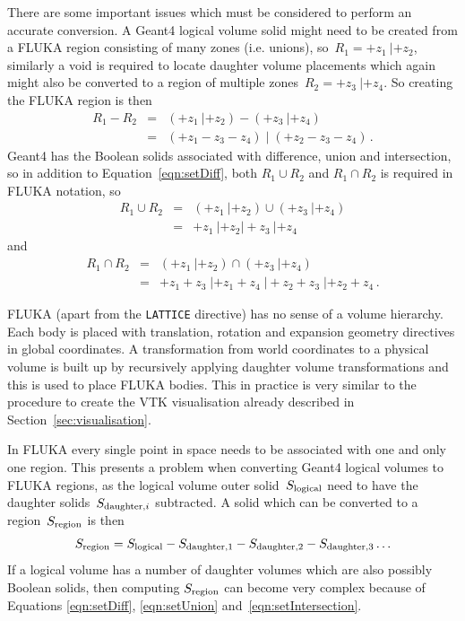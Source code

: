 \documentclass[final,5p,times,twocolumn]{elsarticle}
\newcommand{\fluka}[1]{\texttt{\MakeUppercase{#1}}}
\begin{document}
There are some important issues which must be considered to perform an accurate conversion. 
A Geant4 logical volume solid might need to be created from a FLUKA region consisting of many zones (i.e. unions), 
so~$R_1 = +z_1\: | +z_2$, similarly a void is required to locate daughter volume placements which again 
might also be converted to a region of multiple zones~$R_2= +z_3 \: | +z_4$. So creating the FLUKA region is then 
\begin{eqnarray}
R_1 - R_2 	& = & (+z_1 \: | +z_2) - ( +z_3 \: | +z_4) 			\\
			& = & (+z_1 - z_3 - z_4) \;  | \; (+z_2 - z_3 - z_4)\,.	
\label{eqn:setDiff}
\end{eqnarray}
Geant4 has the Boolean solids associated with difference, union and intersection, so in addition to 
Equation~\ref{eqn:setDiff}, both $R_1 \cup R_2$ and $R_1 \cap R_2$ is required in FLUKA notation, so 
\begin{eqnarray}
R_1 \cup R_2 	& = & (+z_1 \: | +z_2)  \cup ( +z_3 \: | +z_4) \\
			& = & +z_1 \: | +z_2 |  +z_3 \: | +z_4
\label{eqn:setUnion}
\end{eqnarray}
and 
\begin{eqnarray}
R_1 \cap R_2 	& = & (+z_1 \: | +z_2) \cap ( +z_3 \: | +z_4) \\
			& = & +z_1 +z_3  \; | +z_1 +z_4 \; | +z_2 +z_3 \; | +z_2 +z_4\,.
\label{eqn:setIntersection}
\end{eqnarray}

FLUKA (apart from the \fluka{lattice} directive) has no sense of a volume hierarchy. Each body is placed with 
translation, rotation and expansion geometry directives in global coordinates. A transformation from world 
coordinates to a physical volume is built up by recursively applying daughter volume transformations 
and  this is used to place FLUKA bodies. This  in practice is very similar to the procedure to create the 
VTK visualisation already described in Section~\ref{sec:visualisation}.

In FLUKA every single point in space needs to be associated with one and only one region. This presents a problem 
when converting Geant4 logical volumes to FLUKA regions, as the logical volume outer solid~$S_{\rm logical}$ 
need to have the daughter  solids~$S_{{\rm daughter},i}$ subtracted. A solid which can be converted 
to a region~$S_{\rm region}$ is then 
\begin{equation}
S_{\rm region} =  S_{\rm logical} - S_{\rm daughter,1} - S_{\rm daughter,2} - S_{\rm daughter,3} \ldots 
\label{eqn:logicalSubtraction}
\end{equation} 
If a logical volume has a number of daughter volumes which are also possibly Boolean solids, then computing 
$S_{\rm region}$ can become very complex because of Equations \ref{eqn:setDiff}, \ref{eqn:setUnion} and~\ref{eqn:setIntersection}. 
\end{document}
